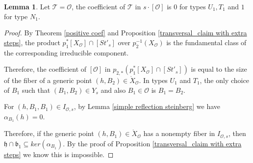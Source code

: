 \documentclass[12pt]{article}
\newcommand{\s}{\mathcal{O}}
\theoremstyle{plain}
\theoremstyle{definition}
\newtheorem{lemma}[theorem]{Lemma}
\begin{document}
\begin{lemma}\label{coef same}
    Let $\mathcal{T}=\mathcal{O}$, the coefficient of $\mathcal{T}$ in ${s}\cdot [\mathcal{O}]$ is $0$ for types $U_{1},T_{1}$ and $1$ for type $N_{1}$.
\end{lemma}
\begin{proof}
     By Theorem \ref{positive coef} and Proposition \ref{transversal_claim with extra steps}, the product $p_1^*[{X}_\s]\cap [St'_s]$ over $p_2^{-1}(X_\s)$ is the fundamental class of the corresponding irreducible component.

    Therefore, the coefficient of $[\mathcal{O}]$ in $p_{2,*}(p_1^*[{X}_\s]\cap [St'_s])$ is equal to the size of the fiber of a generic point $(h,B_{2})\in \mathring{X}_{\mathcal{O}}$. In types $U_{1}$ and $T_{1}$, the only choice of $B_{1}$ such that $(B_1,B_2)\in Y_s$ and also $B_{1}\in \mathcal{O}$ is $B_{1}=B_{2}$. 
    
    For $(h,B_{1},B_{1})\in I_{\s,s}$, by Lemma \ref{simple reflection steinberg} we have $\alpha_{B_1} (h)=0$.

    Therefore, if the generic point $(h,B_{1})\in \mathring{X}_{\mathcal{O}}$ has a nonempty fiber in $I_{\s,s}$, then $\mathfrak{h} \cap \mathfrak{b}_1\subseteq ker(\alpha_{B_1})$. By the proof of Proposition \ref{transversal_claim with extra steps} we know this is impossible.







\end{proof}
\end{document}
